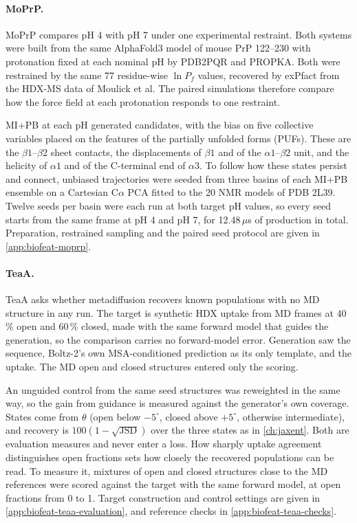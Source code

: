 \paragraph{MoPrP.}
MoPrP compares pH 4 with pH 7 under one experimental restraint. Both systems were built from the same AlphaFold3 model of mouse PrP 122--230\supercite{abramsonAccurateStructurePrediction2024} with protonation fixed at each nominal pH by PDB2PQR and PROPKA.\supercite{dolinskyPDB2PQRExpandingUpgrading2007,olssonPROPKA3ConsistentTreatment2011} Both were restrained by the same 77 residue-wise $\ln P_f$ values, recovered by exPfact from the HDX-MS data of Moulick et al.\supercite{skinnerEstimatingConstraintsProtection2019,moulickPartiallyUnfoldedForms2015} The paired simulations therefore compare how the force field at each protonation responds to one restraint.

MI+PB at each pH generated candidates, with the bias on five collective variables placed on the features of the partially unfolded forms (PUFs). These are the $\beta1$--$\beta2$ sheet contacts, the displacements of $\beta1$ and of the $\alpha1$--$\beta2$ unit, and the helicity of $\alpha1$ and of the C-terminal end of $\alpha3$. To follow how these states persist and connect, unbiased trajectories were seeded from three basins of each MI+PB ensemble on a Cartesian C$\alpha$ PCA fitted to the 20 NMR models of PDB 2L39. Twelve seeds per basin were each run at both target pH values, so every seed starts from the same frame at pH 4 and pH 7, for 12.48\,$\mu$s of production in total. Preparation, restrained sampling and the paired seed protocol are given in \cref{app:biofeat-moprp}.

\paragraph{TeaA.}
TeaA asks whether metadiffusion recovers known populations with no MD structure in any run. The target is synthetic HDX uptake from MD frames at 40\,\% open and 60\,\% closed, made with the same forward model that guides the generation, so the comparison carries no forward-model error. Generation saw the sequence, Boltz-2's own MSA-conditioned prediction as its only template, and the uptake. The MD open and closed structures entered only the scoring.

An unguided control from the same seed structures was reweighted in the same way, so the gain from guidance is measured against the generator's own coverage. States come from $\theta$ (open below $-5^\circ$, closed above $+5^\circ$, otherwise intermediate), and recovery is $100(1-\sqrt{\mathrm{JSD}})$ over the three states as in \cref{ch:jaxent}. Both are evaluation measures and never enter a loss. How sharply uptake agreement distinguishes open fractions sets how closely the recovered populations can be read. To measure it, mixtures of open and closed structures close to the MD references were scored against the target with the same forward model, at open fractions from 0 to 1. Target construction and control settings are given in \cref{app:biofeat-teaa-evaluation}, and reference checks in \cref{app:biofeat-teaa-checks}.

